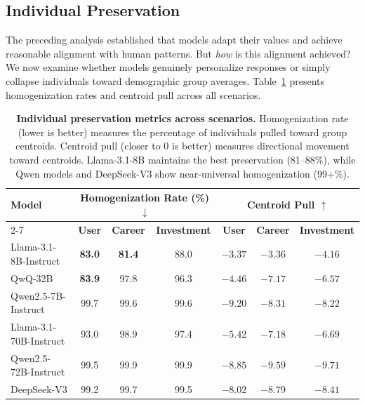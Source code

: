 \documentclass[acmlarge]{acmart}
\begin{document}
\subsection{Individual Preservation}
\label{sec:individual_preservation_analysis}

The preceding analysis established that models adapt their values and achieve reasonable alignment with human patterns. But \textit{how} is this alignment achieved? We now examine whether models genuinely personalize responses or simply collapse individuals toward demographic group averages. Table~\ref{tab:preservation_cross_format} presents homogenization rates and centroid pull across all scenarios.

\begin{table}[H]
\centering
\small
\begin{tabular}{l|ccc|ccc}
    \toprule
    \multirow{2}{*}{\textbf{Model}}
    & \multicolumn{3}{c|}{\textbf{Homogenization Rate (\%) $\downarrow$}}
    & \multicolumn{3}{c}{\textbf{Centroid Pull $\uparrow$}} \\
    \cmidrule{2-7}
    & \textbf{User} & \textbf{Career} & \textbf{Investment}
    & \textbf{User} & \textbf{Career} & \textbf{Investment} \\
    \midrule
    Llama-3.1-8B-Instruct  & \textbf{83.0} & \textbf{81.4} & 88.0 & $-3.37$ & $-3.36$ & $-4.16$ \\
    QwQ-32B               & \textbf{83.9} & 97.8 & 96.3 & $-4.46$ & $-7.17$ & $-6.57$ \\
    Qwen2.5-7B-Instruct   & 99.7 & 99.6 & 99.6 & $-9.20$ & $-8.31$ & $-8.22$ \\
    Llama-3.1-70B-Instruct & 93.0 & 98.9 & 97.4 & $-5.42$ & $-7.18$ & $-6.69$ \\
    Qwen2.5-72B-Instruct  & 99.5 & 99.9 & 99.9 & $-8.85$ & $-9.59$ & $-9.71$ \\
    DeepSeek-V3           & 99.2 & 99.7 & 99.5 & $-8.02$ & $-8.79$ & $-8.41$ \\
    \bottomrule
\end{tabular}
\caption{
\textbf{Individual preservation metrics across scenarios.}
Homogenization rate (lower is better) measures the percentage of individuals pulled toward group centroids. Centroid pull (closer to 0 is better) measures directional movement toward centroids. Llama-3.1-8B maintains the best preservation (81--88\%), while Qwen models and DeepSeek-V3 show near-universal homogenization (99+\%).
}
\label{tab:preservation_cross_format}
\end{table}
\end{document}
